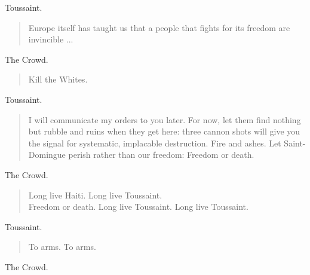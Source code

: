 \documentclass[letterpaper,article,12pt,oneside,notitlepage]{memoir}
\begin{document}
\begin{center}Toussaint.\end{center}

\begin{verse}
\indent Europe itself has taught us that a people that fights for its freedom are invincible ... \\
\end{verse}

\begin{center}The Crowd.\end{center}

\begin{verse}
\hspace{1cm} Kill the Whites. \\
\end{verse}

\begin{center}Toussaint.\end{center}

\begin{verse}
\indent I will communicate my orders to you later. For now, let them find nothing but rubble and ruins when they get here: three cannon shots will give you the signal for systematic, implacable destruction. Fire and ashes. Let Saint-Domingue perish rather than our freedom: Freedom or death. \\
\end{verse}

\begin{center}The Crowd.\end{center}

\begin{verse}
\hspace{1cm} Long live Haiti. Long live Toussaint. \\
Freedom or death. Long live Toussaint. Long live Toussaint. \\
\end{verse}

\begin{center}Toussaint.\end{center}

\begin{verse}
\hspace{1cm} To arms. To arms. \\
\end{verse}

\begin{center}The Crowd.\end{center}
\end{document}
